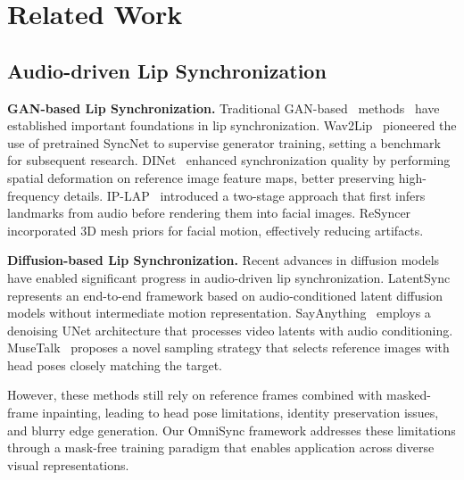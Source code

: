 \section{Related Work}
\vspace{-0.5em}

\subsection{Audio-driven Lip Synchronization}
\textbf{GAN-based Lip Synchronization.} Traditional GAN-based~\cite{goodfellow2020generative} methods~\cite{prajwal2020lip,wang2023seeing,cheng2022videoretalking,ma2023styletalk,gupta2023towards} have established important foundations in lip synchronization. Wav2Lip~\cite{prajwal2020lip} pioneered the use of pretrained SyncNet to supervise generator training, setting a benchmark for subsequent research. DINet~\cite{zhang2023dinet} enhanced synchronization quality by performing spatial deformation on reference image feature maps, better preserving high-frequency details. IP-LAP~\cite{zhong2023identity} introduced a two-stage approach that first infers landmarks from audio before rendering them into facial images. ReSyncer~\cite{guan2024resyncer} incorporated 3D mesh priors for facial motion, effectively reducing artifacts. 

\textbf{Diffusion-based Lip Synchronization.} Recent advances in diffusion models~\cite{mukhopadhyay2024diff2lip,zhang2024musetalk,li2024latentsync,ma2025sayanything} have enabled significant progress in audio-driven lip synchronization. LatentSync~\cite{li2024latentsync} represents an end-to-end framework based on audio-conditioned latent diffusion models without intermediate motion representation. SayAnything~\cite{ma2025sayanything} employs a denoising UNet architecture that processes video latents with audio conditioning. MuseTalk~\cite{zhang2024musetalk} proposes a novel sampling strategy that selects reference images with head poses closely matching the target.

However, these methods still rely on reference frames combined with masked-frame inpainting, leading to head pose limitations, identity preservation issues, and blurry edge generation. Our OmniSync framework addresses these limitations through a mask-free training paradigm that enables application across diverse visual representations.

\vspace{-0.5em}
